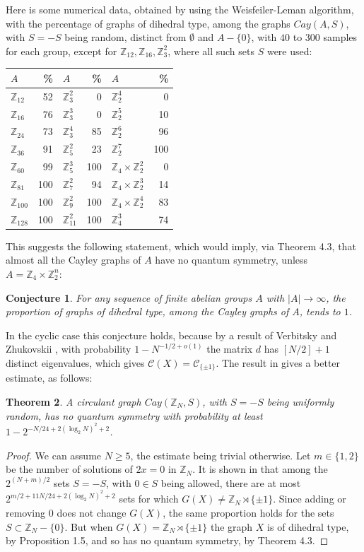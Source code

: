 \documentclass[11pt]{amsart}
\newtheorem{theorem}{Theorem}[section]
\newtheorem{conjecture}[theorem]{Conjecture}
\newcommand{\C}{\mathcal C}
\newcommand{\Z}{\mathbb Z}
\begin{document}
Here is some numerical data, obtained by using the Weisfeiler-Leman algorithm, with the percentage of graphs of dihedral type, among the graphs $Cay(A,S)$, with $S=-S$ being random, distinct from $\emptyset$ and $A-\{0\}$, with $40$ to $300$ samples for each group, except for $\Z_{12},\Z_{16},\Z_3^2$, where all such sets $S$ were used:
\begin{center}
\begin{tabular}{lr@{\qquad\qquad}lr@{\qquad\qquad}lr}
\toprule
$A$&\%&$A$&\%&$A$&\%\\
\midrule
$\Z_{12}$&52&$\Z_3^2$&0&$\Z_2^4$&0\\
$\Z_{16}$&76&$\Z_3^3$&0&$\Z_2^5$&10\\
$\Z_{24}$&73&$\Z_3^4$&85&$\Z_2^6$&96\\
$\Z_{36}$&91&$\Z_5^2$&23&$\Z_2^7$&100\\
$\Z_{60}$&99&$\Z_5^3$&100&$\Z_4\times\Z_2^2$&0\\
$\Z_{81}$&100&$\Z_7^2$&94&$\Z_4\times\Z_2^3$&14\\
$\Z_{100}$&100&$\Z_9^2$&100&$\Z_4\times\Z_2^4$&83\\
$\Z_{128}$&100&$\Z_{11}^2$&100&$\Z_4^3$&74\\
\bottomrule
\end{tabular}
\end{center}

This suggests the following statement, which would imply, via Theorem 4.3, that almost all the Cayley graphs of $A$ have no quantum symmetry, unless $A=\Z_4\times\Z_2^n$:

\begin{conjecture}
For any sequence of finite abelian groups $A$ with $|A|\to\infty$, the proportion of graphs of dihedral type, among the Cayley graphs of $A$, tends to $1$.
\end{conjecture}

In the cyclic case this conjecture holds, because by a result of Verbitsky and Zhukovskii \cite{vz}, with probability $1-N^{-1/2+o(1)}$ the matrix $d$ has $[N/2]+1$ distinct eigenvalues, which gives $\C(X)=\C_{\{\pm1\}}$. The result in \cite{dsv} gives a better estimate, as follows:

\begin{theorem}
A circulant graph $Cay(\Z_N,S)$, with $S=-S$ being uniformly random, has no quantum symmetry with probability at least $1-2^{-N/24+2(\log_2N)^2+2}$.
\end{theorem}

\begin{proof}
We can assume $N\geq5$, the estimate being trivial otherwise. Let $m\in\{1,2\}$ be the number of solutions of $2x=0$ in $\Z_N$. It is shown in \cite{dsv} that among the $2^{(N+m)/2}$ sets $S=-S$, with $0\in S$ being allowed, there are at most $2^{m/2+11N/24+2(\log_2N)^2+2}$ sets for which $G(X)\neq\Z_N\rtimes\{\pm1\}$. Since adding or removing $0$ does not change $G(X)$, the same proportion holds for the sets $S\subset\Z_N-\{0\}$. But when $G(X)=\Z_N\rtimes\{\pm1\}$ the graph $X$ is of dihedral type, by Proposition 1.5, and so has no quantum symmetry, by Theorem 4.3.
\end{proof}
\end{document}
